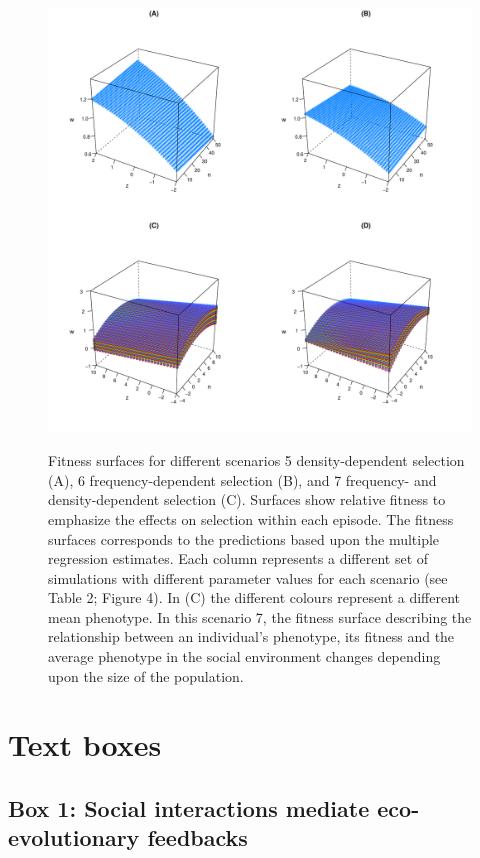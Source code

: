 \documentclass{article}
\begin{document}
\newpage
\begin{figure}  [H]
	\centering
	\includegraphics[width=12cm, height=12cm]{Figures/Fig5.pdf}
	\caption{Fitness surfaces for different scenarios 5 density-dependent selection (A), 6 frequency-dependent selection (B), and 7 frequency- and density-dependent selection (C). Surfaces show relative fitness to emphasize the effects on selection within each episode. The fitness surfaces corresponds to the predictions based upon the multiple regression estimates. Each column represents a different set of simulations with different parameter values for each scenario (see Table 2; Figure 4). In (C) the different colours represent a different mean phenotype. In this scenario 7, the fitness surface describing the relationship between an individual's phenotype, its fitness and the average phenotype in the social environment changes depending upon the size of the population.} 
	\label{fig:surface}
\end{figure}


\newpage

\section{Text boxes}

\subsection{Box 1: Social interactions mediate eco-evolutionary feedbacks}
\end{document}
